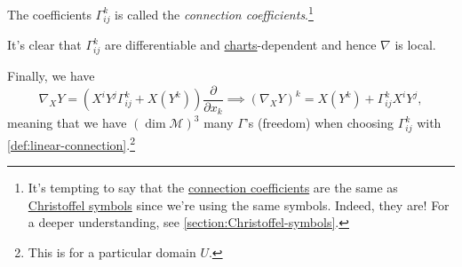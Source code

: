 \begin{notation}\label{not:connection-coefficient}
	The coefficients \(\Gamma ^k_{ij}\) is called the \emph{connection coefficients}.\footnote{It's tempting to say that the \hyperref[not:connection-coefficient]{connection coefficients} are the same as \hyperref[not:Christoffel-symbol]{Christoffel symbols} since we're using the same symbols. Indeed, they are! For a deeper understanding, see \autoref{section:Christoffel-symbols}.}
\end{notation}

\begin{note}
	It's clear that \(\Gamma ^k_{ij}\) are differentiable and \hyperref[def:coordinate-chart]{charts}-dependent and hence \(\nabla \) is local.
\end{note}

Finally, we have
\[
	\nabla _X Y = \left( X^i Y^j \Gamma ^k_{ij} + X(Y^k) \right) \frac{\partial }{\partial x_k}
	\implies (\nabla _X Y)^k = X(Y^k) + \Gamma ^k_{ij} X^i Y^j,
\]
meaning that we have \((\dim \mathcal{M} )^3\) many \(\Gamma\)'s (freedom) when choosing \(\Gamma ^k_{ij}\) with \autoref{def:linear-connection}.\footnote{This is for a particular domain \(U\).}


